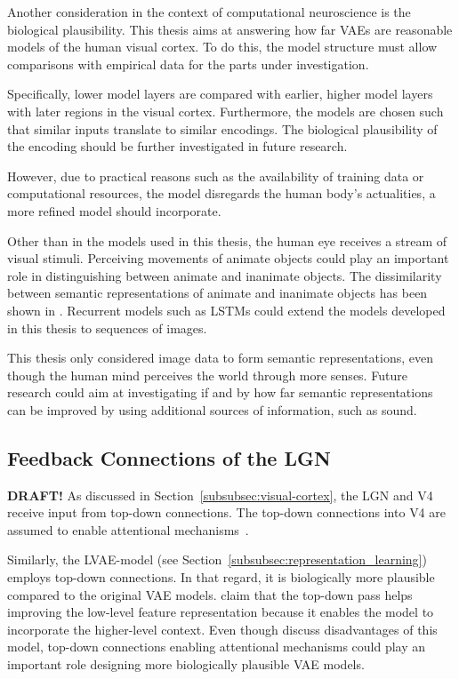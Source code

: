 Another consideration in the context of computational neuroscience is the biological plausibility.
This thesis aims at answering how far \acp{VAE} are reasonable models of the human visual cortex.
To do this, the model structure must allow comparisons with empirical data for the parts under investigation.

Specifically, lower model layers are compared with earlier, higher model layers with later regions in the visual cortex.
Furthermore, the models are chosen such that similar inputs translate to similar encodings.
The biological plausibility of the encoding should be further investigated in future research.

However, due to practical reasons such as the availability of training data or computational resources, the model disregards the human body's actualities, a more refined model should incorporate.

Other than in the models used in this thesis, the human eye receives a stream of visual stimuli.
Perceiving movements of animate objects could play an important role in distinguishing between animate and inanimate objects.
The dissimilarity between semantic representations of animate and inanimate objects has been shown in \citet{khaligh2014deep}.
Recurrent models such as LSTMs could extend the models developed in this thesis to sequences of images.

This thesis only considered image data to form semantic representations, even though the human mind perceives the world through more senses.
Future research could aim at investigating if and by how far semantic representations can be improved by using additional sources of information, such as sound.

\subsection{Feedback Connections of the \acl{LGN}}\label{subsec:feedback-connections-of-the-lateral-geniculate-nucleus}
\textbf{DRAFT!}
As discussed in Section~\ref{subsubsec:visual-cortex}, the \ac{LGN} and \ac{V4} receive input from top-down connections.
The top-down connections into \ac{V4} are assumed to enable attentional mechanisms~\citep{roe2012toward}.

Similarly, the \ac{LVAE}-model (see Section~\ref{subsubsec:representation_learning}) employs top-down connections.
In that regard, it is biologically more plausible compared to the original \ac{VAE} models.
\citet{sonderby2016ladder} claim that the top-down pass helps improving the low-level feature representation because it enables the model to incorporate the higher-level context.
Even though \citet{zhao2017learning} discuss disadvantages of this model, top-down connections enabling attentional mechanisms could play an important role designing more biologically plausible \ac{VAE} models.

